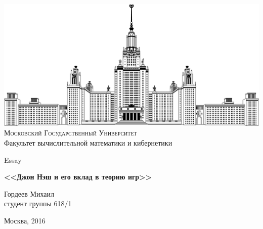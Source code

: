 \documentclass [12pt, a4paper] {article}
\begin{document}
\thispagestyle {empty}

\begin {center}
\ \vspace{-4cm}

\includegraphics [width = 0.5 \textwidth] {msu.png} \\
{\scshape Московский Государственный Университет} \\
Факультет вычислительной математики и кибернетики\\

\vspace {5cm}

{\LARGE Essay}

\vspace {1cm}

{\Huge \bfseries
<<Джон Нэш и его вклад в теорию игр>> \\}
\end {center}

\vfill
\vfill

\begin {flushright}
  \large
  Гордеев Михаил \\
  студент группы 618/1 \\

  \vspace {5mm}
\end {flushright}

\vfill

\begin {center}
Москва, 2016
\end {center}

\enlargethispage {4 \baselineskip}

\newpage
\end{document}
